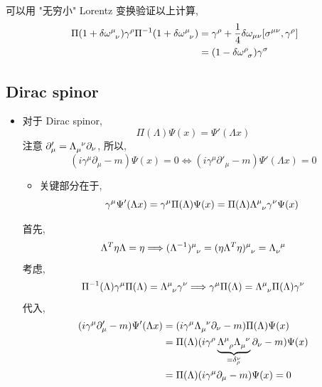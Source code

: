 \begin{itemize}
\begin{tcolorbox}[title=calculation:]
		\noindent\hdashrule[0.5ex]{\linewidth}{0.5pt}{1mm} %
		
		可以用 "无穷小" Lorentz 变换验证以上计算,
		\begin{align}
			\Pi(1 + \delta \tensor{\omega}{^\mu_\nu}) \gamma^\rho \Pi^{- 1}(1 + \delta \tensor{\omega}{^\mu_\nu}) &= \gamma^\rho + \frac{1}{4} \delta \omega_{\mu \nu} [\sigma^{\mu \nu}, \gamma^\rho] \notag \\
			&= (1 - \delta \tensor{\omega}{^\rho_\sigma}) \gamma^\sigma
		\end{align}
	\end{tcolorbox}
\end{itemize}

\subsection{Dirac spinor}
\begin{itemize}
	\item 对于 Dirac spinor,
	\begin{equation}
		\Pi(\Lambda) \Psi(x) = \Psi'(\Lambda x)
	\end{equation}
	注意 $\partial'_\mu = \tensor{\Lambda}{_\mu^\nu} \partial_\nu$, 所以,
	\begin{equation} \label{6.2.12}
		(i \gamma^\mu \partial_\mu - m) \Psi(x) = 0 \iff (i \gamma^\mu \partial'_\mu - m) \Psi'(\Lambda x) = 0
	\end{equation}
	\begin{itemize}
		\item 关键部分在于,
		\begin{equation}
			\gamma^\mu \Psi'(\Lambda x) = \gamma^\mu \Pi(\Lambda) \Psi(x) = \Pi(\Lambda) \tensor{\Lambda}{^\mu_\nu} \gamma^\nu \Psi(x)
		\end{equation}
	\end{itemize}
	
	\begin{tcolorbox}[title=calculation:]
		首先,
		\begin{equation}
			\Lambda^T \eta \Lambda = \eta \Longrightarrow \tensor{(\Lambda^{- 1})}{^\mu_\nu} = \tensor{(\eta \Lambda^T \eta)}{^\mu_\nu} = \tensor{\Lambda}{_\nu^\mu}
		\end{equation}
		考虑,
		\begin{equation}
			\Pi^{- 1}(\Lambda) \gamma^\mu \Pi(\Lambda) = \tensor{\Lambda}{^\mu_\nu} \gamma^\nu \Longrightarrow \gamma^\mu \Pi(\Lambda) = \tensor{\Lambda}{^\mu_\nu} \Pi(\Lambda) \gamma^\nu
		\end{equation}
		代入,
		\begin{align}
			(i \gamma^\mu \partial'_\mu - m) \Psi'(\Lambda x) &= (i \gamma^\mu \tensor{\Lambda}{_\mu^\nu} \partial_\nu - m) \Pi(\Lambda) \Psi(x) \notag \\
			&= \Pi(\Lambda) (i \gamma^\rho \underbrace{\tensor{\Lambda}{^\mu_\rho} \tensor{\Lambda}{_\mu^\nu}}_{= \delta^\nu_\rho} \partial_\nu - m) \Psi(x) \notag \\
			&= \Pi(\Lambda) (i \gamma^\mu \partial_\mu - m) \Psi(x) = 0
		\end{align}
	\end{tcolorbox}
\end{itemize}

